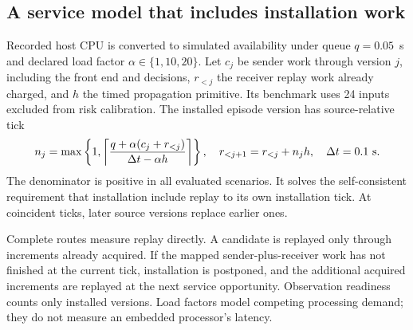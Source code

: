 \subsection{A service model that includes installation work}
Recorded host CPU is converted to simulated availability under queue $q=0.05$~s and declared load factor $\alpha\in\{1,10,20\}$. Let $c_j$ be sender work through version $j$, including the front end and decisions, $r_{<j}$ the receiver replay work already charged, and $h$ the timed propagation primitive. Its benchmark uses 24 inputs excluded from risk calibration. The installed episode version has source-relative tick
\begin{equation}
n_j=\max\left\{1,\left\lceil
\frac{q+\alpha(c_j+r_{<j})}{\Delta t-\alpha h}
\right\rceil\right\},\quad
r_{<j+1}=r_{<j}+n_jh,\quad \Delta t=0.1\ {\rm s}.\label{eq:delivery}
\end{equation}
The denominator is positive in all evaluated scenarios. It solves the self-consistent requirement that installation include replay to its own installation tick. At coincident ticks, later source versions replace earlier ones.

Complete routes measure replay directly. A candidate is replayed only through increments already acquired. If the mapped sender-plus-receiver work has not finished at the current tick, installation is postponed, and the additional acquired increments are replayed at the next service opportunity. Observation readiness counts only installed versions. Load factors model competing processing demand; they do not measure an embedded processor's latency.
